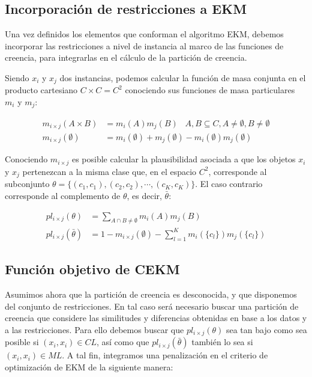 \subsection{Incorporación de restricciones a EKM}

Una vez definidos los elementos que conforman el algoritmo \acs{EKM}, debemos incorporar las restricciones a nivel de instancia al marco de las funciones de creencia, para integrarlas en el cálculo de la partición de creencia.

Siendo $x_i$ y $x_j$ dos instancias, podemos calcular la función de masa conjunta en el producto cartesiano $C \times C = C^2$ conociendo sus funciones de masa particulares $m_i$ y $m_j$:

\begin{equation}
\begin{split}
m_{i \times j}(A \times B) &= m_i(A)m_j(B) \;\;\; A,B \subseteq C, A \neq \emptyset, B \neq \emptyset\\
m_{i \times j}(\emptyset) & = m_i(\emptyset) + m_j(\emptyset) - m_i(\emptyset)m_j(\emptyset)
\end{split}
\label{eqn21}
\end{equation}

Conociendo $ m_{i \times j} $ es posible calcular la plausibilidad asociada a que los objetos $x_i$ y $x_j$ pertenezcan a la misma clase que, en el espacio $C^2$, corresponde al subconjunto $\theta = \{(c_1, c_1), (c_2, c_2), \cdots, (c_K, c_K)\}$. El caso contrario corresponde al complemento de $\theta$, es decir, $\bar{\theta}$:

\begin{equation}
\begin{split}
pl_{i\times j}(\theta) &= \sum_{A \cap B \ne \emptyset}m_i(A)m_j(B)\\
pl_{i\times j}(\bar{\theta}) &= 1 - m_{i\times j}(\emptyset) - \sum_{l=1}^{K} m_i(\{c_l\})m_j(\{c_l\})
\end{split}
\label{eqn23}
\end{equation}

\subsection{Función objetivo de CEKM}

Asumimos ahora que la partición de creencia es desconocida, y que disponemos del conjunto de restricciones. En tal caso será necesario buscar una partición de creencia que considere las similitudes y diferencias obtenidas en base a los datos y a las restricciones. Para ello debemos buscar que $pl_{i\times j} (\theta)$ sea tan bajo como sea posible si $(x_i, x_i) \in CL$, así como que $pl_{i\times j} (\bar{\theta})$ también lo sea si $(x_i, x_i) \in ML$. A tal fin, integramos una penalización en el criterio de optimización de \acs{EKM} de la siguiente manera:

